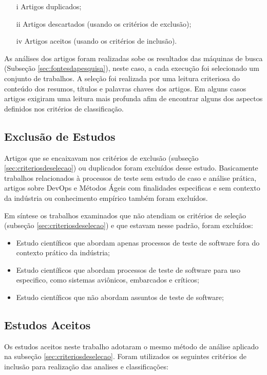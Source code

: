 \begin{itemize}
\item [i] Artigos duplicados;
\item [ii] Artigos descartados (usando os critérios de exclusão);
\item [iv] Artigos aceitos (usando os critérios de inclusão).
\end{itemize}

As análises dos artigos foram realizadas sobe os resultados das máquinas de busca (Subseção \ref{sec:fontesdapesquisa}), neste caso, a cada execução foi selecionado um conjunto de trabalhos. A seleção foi realizada por uma leitura criteriosa do conteúdo dos resumos, títulos e palavras chaves dos artigos. Em alguns casos artigos exigiram uma leitura mais profunda afim de encontrar alguns dos aspectos definidos nos critérios de classificação.

\subsection{Exclusão de Estudos}
\label{sec:exclusaoestudos}

Artigos que se encaixavam nos critérios de exclusão (subseção \ref{sec:criteriosdeselecao}) ou duplicados foram excluídos desse estudo. Basicamente trabalhos relacionados à processos de teste sem estudo de caso e análise prática, artigos sobre DevOps e Métodos Ágeis com finalidades especificas e sem contexto da indústria ou conhecimento empírico também foram excluídos.

Em síntese os trabalhos examinados que não atendiam os critérios de seleção (subseção \ref{sec:criteriosdeselecao}) e que estavam nesse padrão, foram excluídos:

\begin{itemize}
\item Estudo científicos que abordam apenas processos de teste de software fora do contexto prático da indústria;
\item Estudo científicos que abordam processos de teste de software para uso especifico, como sistemas aviônicos, embarcados e críticos;
\item Estudo científicos que não abordam assuntos de teste de software;
\end{itemize}

\subsection{Estudos Aceitos}
\label{sec:estudosaceitos}
Os estudos aceitos neste trabalho adotaram o mesmo método de análise aplicado na subseção \ref{sec:criteriosdeselecao}. Foram utilizados os seguintes critérios de inclusão para realização das analises e classificações:

